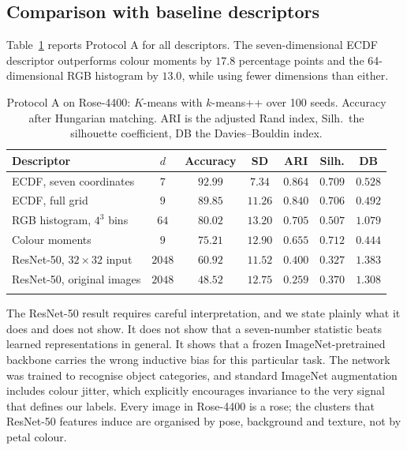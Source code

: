 \documentclass[pdflatex,sn-basic]{sn-jnl}
\theoremstyle{thmstyleone}%
\theoremstyle{thmstyletwo}%
\theoremstyle{thmstylethree}%
\begin{document}
\subsection{Comparison with baseline descriptors}\label{sec:baseline-results}

Table~\ref{tab:descriptors} reports Protocol A for all descriptors. The
seven-dimensional ECDF descriptor outperforms colour moments by $17.8$
percentage points and the 64-dimensional RGB histogram by $13.0$, while using
fewer dimensions than either.

\begin{table}[h]
\centering
\caption{Protocol A on Rose-4400: $K$-means with $k$-means++ over 100 seeds.
Accuracy after Hungarian matching. ARI is the adjusted Rand index, Silh.\ the
silhouette coefficient, DB the Davies--Bouldin index.}\label{tab:descriptors}
\begin{tabular}{@{}lcccccc@{}}
\toprule
Descriptor & $d$ & Accuracy & SD & ARI & Silh. & DB \\
\midrule
ECDF, seven coordinates       & $7$    & $\mathbf{92.99}$ & $7.34$  & $\mathbf{0.864}$ & $0.709$ & $0.528$ \\
ECDF, full grid               & $9$    & $89.85$ & $11.26$ & $0.840$ & $0.706$ & $0.492$ \\
RGB histogram, $4^3$ bins     & $64$   & $80.02$ & $13.20$ & $0.705$ & $0.507$ & $1.079$ \\
Colour moments                & $9$    & $75.21$ & $12.90$ & $0.655$ & $0.712$ & $0.444$ \\
ResNet-50, $32\times32$ input & $2048$ & $60.92$ & $11.52$ & $0.400$ & $0.327$ & $1.383$ \\
ResNet-50, original images    & $2048$ & $48.52$ & $12.75$ & $0.259$ & $0.370$ & $1.308$ \\
\botrule
\end{tabular}
\end{table}

The ResNet-50 result requires careful interpretation, and we state plainly what
it does and does not show. It does not show that a seven-number statistic beats
learned representations in general. It shows that a frozen
ImageNet-pretrained backbone carries the wrong inductive bias for this
particular task. The network was trained to recognise object categories, and
standard ImageNet augmentation includes colour jitter, which explicitly
encourages invariance to the very signal that defines our labels. Every image
in Rose-4400 is a rose; the clusters that ResNet-50 features induce are
organised by pose, background and texture, not by petal colour.
\end{document}
